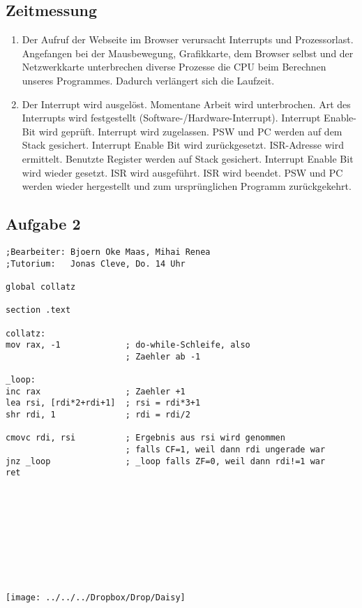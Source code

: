\documentclass[paper=a4, english, ngerman]{scrartcl}
\begin{document}
	\subsection*{Zeitmessung}
	\begin{enumerate}
	\item Der Aufruf der Webseite im Browser verursacht Interrupts und Prozessorlast. Angefangen bei der Mausbewegung, Grafikkarte, dem Browser selbst und der Netzwerkkarte unterbrechen diverse Prozesse die CPU beim Berechnen unseres Programmes. Dadurch verlängert sich die Laufzeit.
	
	\item Der Interrupt wird ausgelöst. Momentane Arbeit wird unterbrochen. Art des Interrupts wird festgestellt (Software-/Hardware-Interrupt). Interrupt Enable-Bit wird geprüft. Interrupt wird zugelassen. PSW und PC werden auf dem Stack gesichert. Interrupt Enable Bit wird zurückgesetzt. ISR-Adresse wird ermittelt. Benutzte Register werden auf Stack gesichert. Interrupt Enable Bit wird wieder gesetzt. ISR wird ausgeführt. ISR wird beendet. PSW und PC werden wieder hergestellt und zum ursprünglichen Programm zurückgekehrt.
	\end{enumerate}

\pagebreak

	\subsection*{Aufgabe 2}
\begin{lstlisting}
;Bearbeiter: Bjoern Oke Maas, Mihai Renea
;Tutorium:   Jonas Cleve, Do. 14 Uhr

global collatz

section .text

collatz:
mov rax, -1				; do-while-Schleife, also
						; Zaehler ab -1

_loop:
inc rax					; Zaehler +1
lea rsi, [rdi*2+rdi+1]	; rsi = rdi*3+1
shr rdi, 1				; rdi = rdi/2

cmovc rdi, rsi			; Ergebnis aus rsi wird genommen
						; falls CF=1, weil dann rdi ungerade war
jnz _loop				; _loop falls ZF=0, weil dann rdi!=1 war
ret




\end{lstlisting}

\begin{center}
	\ \\
	\ \\
	\ \\
	\ \\
	\ \\
	
	
	\texttt{[image: ../../../Dropbox/Drop/Daisy]}
\end{center}
\end{document}
